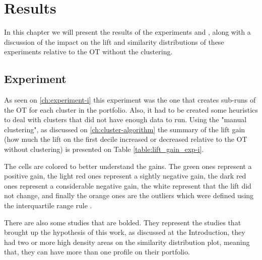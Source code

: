 \chapter{Results}

In this chapter we will present the results of the experiments \nameExperimentI{} and \nameExperimentII{}, along with a discussion of the impact on the lift and similarity distributions of these experiments relative to the OT without the clustering.

\section{Experiment \nameExperimentI}

As seen on \ref{ch:experiment-i} this experiment was the one that creates sub-runs of the OT for each cluster in the portfolio. Also, it had to be created some heuristics to deal with clusters that did not have enough data to run. Using the "manual clustering", as discussed on \ref{ch:cluster-algorithm} the summary of the lift gain (how much the lift on the first decile increased or decreased relative to the OT without clustering) is presented on Table \ref{table:lift_gain_exp-i}. 

The cells are colored to better understand the gains. The green ones represent a positive gain, the light red ones represent a sightly negative gain, the dark red ones represent a considerable negative gain, the white represent that the lift did not change, and finally the orange ones are the outliers which were defined using the interquartile range rule \cite{upton1996understanding}. 

There are also some studies that are bolded. They represent the studies that brought up the hypothesis of this work, as discussed at the Introduction, they had two or more high density areas on the similarity distribution plot, meaning that, they can have more than one profile on their portfolio.

